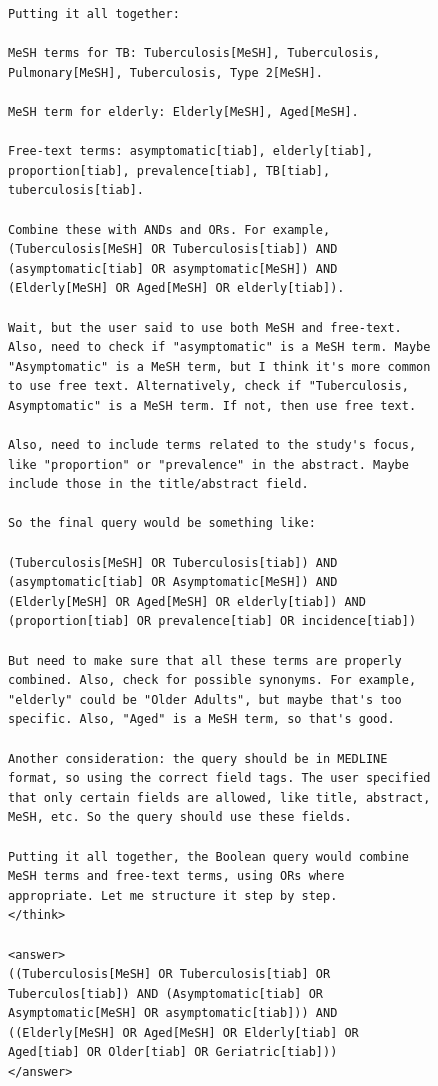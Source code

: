 \begin{figure}[p]
\begin{CombinedBox}
\begin{lstlisting}
Putting it all together: 

MeSH terms for TB: Tuberculosis[MeSH], Tuberculosis, Pulmonary[MeSH], Tuberculosis, Type 2[MeSH]. 

MeSH term for elderly: Elderly[MeSH], Aged[MeSH].

Free-text terms: asymptomatic[tiab], elderly[tiab], proportion[tiab], prevalence[tiab], TB[tiab], tuberculosis[tiab].

Combine these with ANDs and ORs. For example, (Tuberculosis[MeSH] OR Tuberculosis[tiab]) AND (asymptomatic[tiab] OR asymptomatic[MeSH]) AND (Elderly[MeSH] OR Aged[MeSH] OR elderly[tiab]).

Wait, but the user said to use both MeSH and free-text. Also, need to check if "asymptomatic" is a MeSH term. Maybe "Asymptomatic" is a MeSH term, but I think it's more common to use free text. Alternatively, check if "Tuberculosis, Asymptomatic" is a MeSH term. If not, then use free text.

Also, need to include terms related to the study's focus, like "proportion" or "prevalence" in the abstract. Maybe include those in the title/abstract field.

So the final query would be something like:

(Tuberculosis[MeSH] OR Tuberculosis[tiab]) AND (asymptomatic[tiab] OR Asymptomatic[MeSH]) AND (Elderly[MeSH] OR Aged[MeSH] OR elderly[tiab]) AND (proportion[tiab] OR prevalence[tiab] OR incidence[tiab])

But need to make sure that all these terms are properly combined. Also, check for possible synonyms. For example, "elderly" could be "Older Adults", but maybe that's too specific. Also, "Aged" is a MeSH term, so that's good.

Another consideration: the query should be in MEDLINE format, so using the correct field tags. The user specified that only certain fields are allowed, like title, abstract, MeSH, etc. So the query should use these fields.

Putting it all together, the Boolean query would combine MeSH terms and free-text terms, using ORs where appropriate. Let me structure it step by step.
</think>

<answer>  
((Tuberculosis[MeSH] OR Tuberculosis[tiab] OR Tuberculos[tiab]) AND (Asymptomatic[tiab] OR Asymptomatic[MeSH] OR asymptomatic[tiab])) AND ((Elderly[MeSH] OR Aged[MeSH] OR Elderly[tiab] OR Aged[tiab] OR Older[tiab] OR Geriatric[tiab]))  
</answer>
		\end{lstlisting}
		

\end{CombinedBox}
\end{figure}
